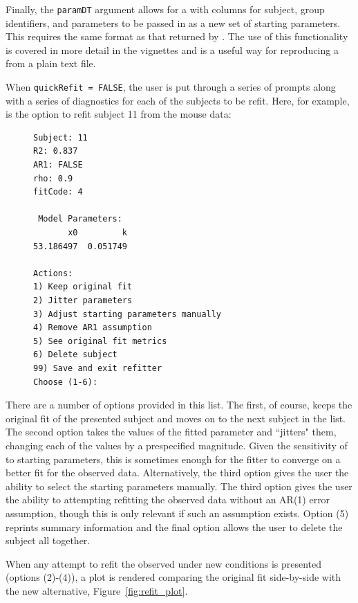 Finally, the \texttt{paramDT} argument allows for a  with columns for subject, group identifiers, and parameters to be passed in as a new set of starting parameters. This  requires the same format as that returned by . The use of this functionality is covered in more detail in the  vignettes and is a useful way for reproducing a  from a plain text file. 

When \texttt{quickRefit = FALSE}, the user is put through a series of prompts along with a series of diagnostics for each of the subjects to be refit. Here, for example, is the option to refit subject 11 from the mouse data:


\begin{singlespace}
\begin{figure}[H]
\centering
\begin{BVerbatim}
Subject: 11
R2: 0.837
AR1: FALSE
rho: 0.9
fitCode: 4

 Model Parameters:
       x0         k 
53.186497  0.051749 

Actions:
1) Keep original fit
2) Jitter parameters
3) Adjust starting parameters manually
4) Remove AR1 assumption
5) See original fit metrics
6) Delete subject
99) Save and exit refitter
Choose (1-6):
\end{BVerbatim}
\end{figure}
\end{singlespace}

There are a number of options provided in this list. The first, of course, keeps the original fit of the presented subject and moves on to the next subject in the list. The second option takes the values of the fitted parameter and ``jitters" them, changing each of the values by a prespecified magnitude. Given the sensitivity of  to starting parameters, this is sometimes enough for the fitter to converge on a better fit for the observed data. Alternatively, the third option gives the user the ability to select the starting parameters manually. The third option gives the user the ability to attempting refitting the observed data without an AR(1) error assumption, though this is only relevant if such an assumption exists. Option (5) reprints summary information and the final option allows the user to delete the subject all together.

When any attempt to refit the observed under new conditions is presented (options (2)-(4)), a plot is rendered comparing the original fit side-by-side with the new alternative, Figure~\ref{fig:refit_plot}.

